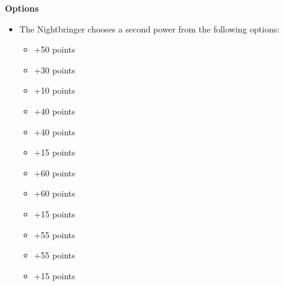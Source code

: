 \begin{minipage}[t]{0.72\textwidth}
	\vspace*{2em}
	\textbf{Options}
	\begin{itemize}
		\item The Nightbringer chooses a second power from the following options:
		\begin{itemize}
			\item {} \dotfill +50 points
			\item {} \dotfill +30 points
			\item {} \dotfill +10 points
			\item {} \dotfill +40 points
			\item {} \dotfill +40 points
			\item {} \dotfill +15 points
			\item {} \dotfill +60 points
			\item {} \dotfill +60 points
			\item {} \dotfill +15 points
			\item {} \dotfill +55 points
			\item {} \dotfill +55 points
			\item {} \dotfill +15 points
		\end{itemize}
	\end{itemize}
\end{minipage}



\newpage
\subsubsection[C'tan Shard of Mephet'ran, the Deceiver]{}

